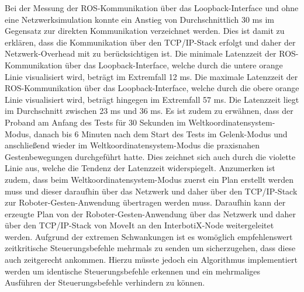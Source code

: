 Bei der Messung der ROS-Kommunikation über das Loopback-Interface und ohne eine Netzwerksimulation konnte ein Anstieg von Durchschnittlich 30 ms im Gegensatz zur direkten Kommunikation verzeichnet werden. Dies ist damit zu erklären, dass die Kommunikation über den TCP/IP-Stack erfolgt und daher der Netzwerk-Overhead mit zu berücksichtigen ist. Die minimale Latenzzeit der ROS-Kommunikation über das Loopback-Interface, welche durch die untere orange Linie visualisiert wird, beträgt im Extremfall \num{12} ms. Die maximale Latenzzeit der ROS-Kommunikation über das Loopback-Interface, welche durch die obere orange Linie visualisiert wird, beträgt hingegen im Extremfall \num{57} ms. Die Latenzzeit liegt im Durchschnitt zwischen 23 ms und 36 ms. Es ist zudem zu erwähnen, dass der Proband am Anfang des Tests für 30 Sekunden im Weltkoordinatensystem-Modus, danach bis 6 Minuten nach dem Start des Tests im Gelenk-Modus und anschließend wieder im Weltkoordinatensystem-Modus die praxisnahen Gestenbewegungen durchgeführt hatte. Dies zeichnet sich auch durch die violette Linie aus, welche die Tendenz der Latenzzeit widerspiegelt. Anzumerken ist zudem, dass beim Weltkoordinatensystem-Modus zuerst ein Plan erstellt werden muss und dieser daraufhin über das Netzwerk und daher über den TCP/IP-Stack zur Roboter-Gesten-Anwendung übertragen werden muss. Daraufhin kann der erzeugte Plan von der Roboter-Gesten-Anwendung über das Netzwerk und daher über den TCP/IP-Stack von MoveIt an den InterbotiX-Node weitergeleitet werden. Aufgrund der extremen Schwankungen ist es womöglich empfehlenswert zeitkritische Steuerungsbefehle mehrmals zu senden um sicherzugehen, dass diese auch zeitgerecht ankommen. Hierzu müsste jedoch ein Algorithmus implementiert werden um identische Steuerungsbefehle erkennen und ein mehrmaliges Ausführen der Steuerungsbefehle verhindern zu können.

